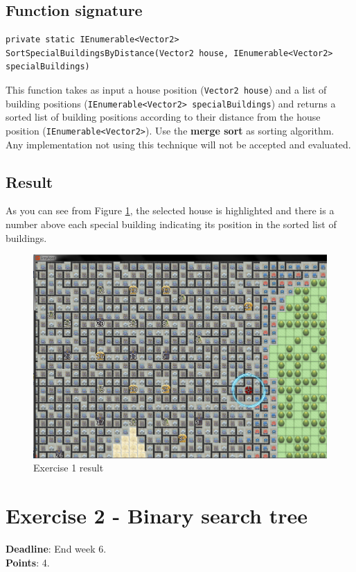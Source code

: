 \documentclass[10pt,a4paper]{article}
\begin{document}
\subsection*{Function signature} 
\begin{lstlisting}
private static IEnumerable<Vector2> SortSpecialBuildingsByDistance(Vector2 house, IEnumerable<Vector2> specialBuildings)
\end{lstlisting}

This function takes as input a house position (\texttt{Vector2 house}) and a list of building positions (\texttt{IEnumerable<Vector2> specialBuildings}) and returns a sorted list of building positions according to their distance from the house position (\texttt{IEnumerable<Vector2>}). Use the \textbf{merge sort} as sorting algorithm. Any implementation not using this technique will not be accepted and evaluated.\\

\subsection*{Result}
As you can see from Figure \ref{img:Ex1}, the selected house is highlighted and there is a number above each special building indicating its position in the sorted list of buildings. 

\begin{figure}[!h]
\centering
\includegraphics[scale=0.25]{img/exercise1}
\caption{Exercise 1 result}
\label{img:Ex1}
\end{figure}

\newpage
\section*{Exercise 2 - Binary search tree}
\textbf{Deadline}: End week 6. \\
\textbf{Points}: 4.
\end{document}
